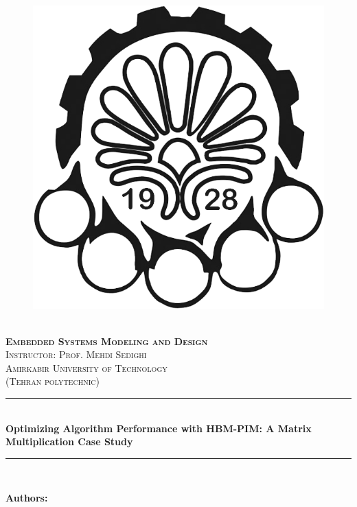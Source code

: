 \documentclass[12pt]{article}
\newcommand{\HRule}{\rule{\linewidth}{0.5mm}} %
\begin{document}
\begin{center}
    \begin{figure}
        \vspace{-1.0cm}
        \centering
        \includegraphics[scale = 0.35]{Images/AUT_logo.png} %
    \end{figure}
    \mbox{}\\[2.0cm]
    \textsc{\Huge \textbf{Embedded Systems Modeling and Design}}\\[1.0cm]
    \textsc{\LARGE Instructor: Prof. Mehdi Sedighi}\\[2.5cm]
    \textsc{\LARGE Amirkabir University of Technology} \\%
    \textsc{(Tehran polytechnic)}
    \HRule\\[0.4cm]
    {\large \bf {\selectfont Optimizing Algorithm Performance with HBM-PIM: A Matrix Multiplication Case Study} }\\[0.2cm]
    \HRule\\[1.5cm]
\end{center}

\begin{flushleft}
    \textbf{\selectfont Authors:}
\end{flushleft}
\end{document}
